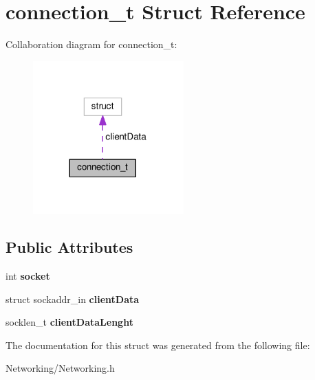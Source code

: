 \hypertarget{structconnection__t}{}\section{connection\+\_\+t Struct Reference}
\label{structconnection__t}


Collaboration diagram for connection\+\_\+t\+:
\nopagebreak
\begin{figure}[H]
\begin{center}
\leavevmode
\includegraphics[width=164pt]{d1/d1a/structconnection__t__coll__graph}
\end{center}
\end{figure}
\subsection*{Public Attributes}
\begin{DoxyCompactItemize}
\item 
int {\bfseries socket}\hypertarget{structconnection__t_a8739936cfe1c4e9f23368e375c976c92}{}\label{structconnection__t_a8739936cfe1c4e9f23368e375c976c92}

\item 
struct sockaddr\+\_\+in {\bfseries client\+Data}\hypertarget{structconnection__t_a2b4d38d53b1ca15e78ff677f8e6fc761}{}\label{structconnection__t_a2b4d38d53b1ca15e78ff677f8e6fc761}

\item 
socklen\+\_\+t {\bfseries client\+Data\+Lenght}\hypertarget{structconnection__t_ada2a0ae1a1bcf2709cfda2d95e9ac1a1}{}\label{structconnection__t_ada2a0ae1a1bcf2709cfda2d95e9ac1a1}

\end{DoxyCompactItemize}


The documentation for this struct was generated from the following file\+:\begin{DoxyCompactItemize}
\item 
Networking/Networking.\+h\end{DoxyCompactItemize}
